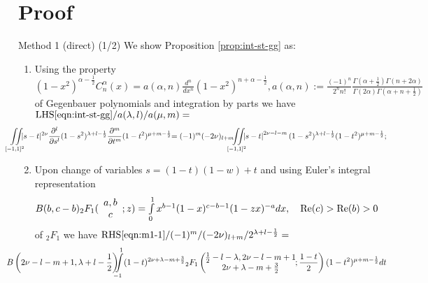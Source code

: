 \documentclass[pdf,notes]{beamer}
\begin{document}
\section{Proof}
\begin{frame}{Method 1 (direct) (1/2)}
	\scriptsize
	We show Proposition \ref{prop:int-st-gg} as:
	\begin{enumerate}
		\item Using the property $
				(1-x^2)^{\alpha-\frac{1}{2}}C_n^\alpha(x)=a(\alpha,n)
				\frac{d^n}{dx^n} (1-x^2)^{n+\alpha-\frac{1}{2}}, a(\alpha,n):=\frac{(-1)^n}{2^nn!}\frac{\Gamma\left( \alpha+\frac{1}{2} \right)\Gamma\left( n+2\alpha \right)}{\Gamma(2\alpha)\Gamma\left(\alpha+n+\frac{1}{2}  \right)}$
				of Gegenbauer polynomials and integration by parts we have ${\mbox{LHS}\eqref{eqn:int-st-gg}}/{a(\lambda,l)/a(\mu,m)}=$\begin{equation}
					\kern-1.2cm
					\iint\displaylimits_{[-1,1]^2}
					\kern-0.2cm| s - t |^{2 \nu} \frac{\partial^l}{\partial s^l}(1-s^2)^{\lambda+l-\frac{1}{2}}\frac{\partial^m}{\partial t^m}(1-t^2)^{\mu+m-\frac{1}{2}}
					\kern-0.1cm=(-1)^m(-2\nu)_{l+m}\kern-0.2cm\iint\displaylimits_{[-1,1]^2}\kern-0.2cm\myabs{s-t}^{2\nu-l-m}(1-s^2)^{\lambda+l-\frac{1}{2}}(1-t^2)^{\mu+m-\frac{1}{2}};
					\label{eqn:m1-1}
				\end{equation}
			\item Upon change of variables $s=(1-t)(1-w)+t$ and using Euler's integral representation 
					\vspace{-0.2cm}
				\begin{equation*}
					B(b,c-b){}_2F_1(\begin{array}[]{c}
						a,b\\c
					\end{array};z)=\textstyle\int_0^1x^{b-1}(1-x)^{c-b-1}(1-zx)^{-a}dx,\quad\Re(c)>\Re(b)>0
					\vspace{-0.2cm}
				\end{equation*}
				of ${}_2F_1$
			we have ${\mbox{RHS}\eqref{eqn:m1-1}}/{(-1)^m/(-2\nu)_{l+m}}/2^{\lambda+l-\frac{1}{2}} =$
			\vspace{-0.2cm}
			\begin{equation}
				\kern-1.2cm
				B \left( 2\nu-l-m+1, \lambda+l-\frac{1}{2} \right)
				\kern-0.2cm\int_{-1}^1 (1 - t)^{2 \nu+\lambda-m+\frac{3}{2}} {}_2 F_1 \left( \kern-0.2cm\begin{array}{c}
					\frac{1}{2}-l-\lambda, 2\nu-l-m+1\\
					2 \nu+\lambda-m+\frac{3}{2}
				\end{array}\kern-0.2cm ; \frac{1 - t}{2} \right)(1-t^2)^{\mu+m-\frac{1}{2}}dt
				\label{eqn:m1-2}
			\end{equation}


\end{enumerate}
\end{frame}
\end{document}
